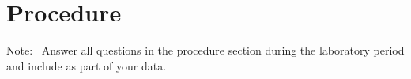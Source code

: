 

%

\section{Procedure}

Note: \ Answer all questions in the procedure section during the
laboratory period and include as part of your data. 

